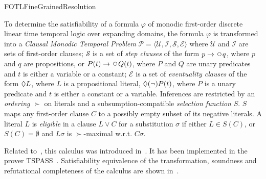 \begin{entry}{FOTLFineGrainedResolution}
\begin{clarifications}
  To determine the satisfiability of a formula $\varphi$ of monodic first-order
  discrete linear time temporal logic over expanding domains, the
  formula $\varphi$ is transformed into a \emph{Clausal Monodic Temporal Problem}
  $\mathcal{P} = \langle \mathcal{U, I, S, E} \rangle$ 
  where $\mathcal{U}$
  and $\mathcal{I}$ 
  are sets of first-order clauses;
  $\mathcal{S}$ 
  is a set of \emph{step clauses} of the form
  $p\rightarrow\Next q$,
  where $p$ and $q$ are propositions, or
  $P(t)\rightarrow\Next Q(t)$, where $P$ and $Q$ are unary predicates
  and $t$ is either a variable or a constant;
  $\mathcal{E}$  
  is a set of \emph{eventuality clauses}
  of the form $\Diamond L$, where $L$ is a propositional literal,
  $\Diamond (\neg)P(t)$, where $P$ is a unary predicate and $t$ is
  either a constant or a variable.
  Inferences are restricted by an \emph{ordering} $\succ$ on literals
  and a subsumption-compatible \emph{selection function} $S$. $S$ maps
  any first-order clause $C$ to a possibly empty subset of its negative literals. 
  A literal $L$ is \emph{eligible} in a clause $L\lor C$ for a
  substitution $\sigma$ if either $L\in S(C)$, or $S(C)=\emptyset$  and
  $L\sigma$ is $\succ$-maximal w.r.t. $C\sigma$.
\end{clarifications}

\begin{history}
  Related to~, this calculus was introduced
  in~\cite{Ludwig+Hustadt@CADE2009}. It has been implemented in the prover
  TSPASS~\cite{Ludwig+Hustadt@AIC2010}. Satisfiability equivalence of the
  transformation, soundness and refutational completeness of the calculus are
  shown in~\cite{Ludwig@Liverpool2010}.
\end{history}

\end{entry}
